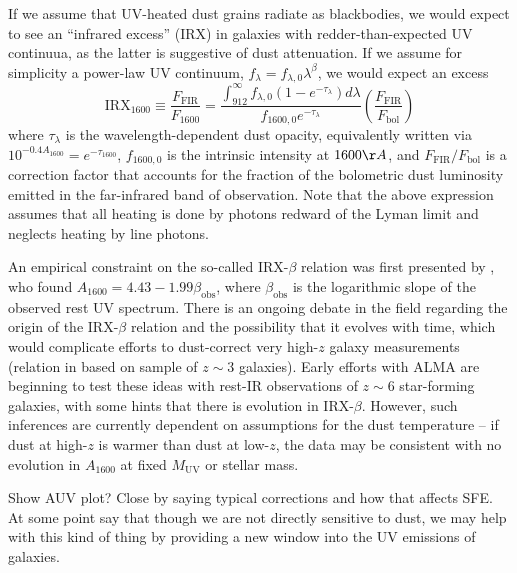 If we assume that UV-heated dust grains radiate as blackbodies, we would expect to see an ``infrared excess'' (IRX) in galaxies with redder-than-expected UV continuua, as the latter is suggestive of dust attenuation. If we assume for simplicity a power-law UV continuum, $f_{\lambda} = f_{\lambda,0} \lambda^{\beta}$, we would expect an excess
\begin{equation}
	\mathrm{IRX}_{1600} \equiv \frac{F_{\mathrm{FIR}}}{F_{1600}} = \frac{\int_{912}^{\infty} f_{\lambda,0} (1 - e^{-\tau_{\lambda}}) d\lambda}{f_{1600,0} e^{-\tau_{\lambda}}} \left(\frac{F_{\mathrm{FIR}}}{F_{\mathrm{bol}}} \right)
\end{equation}
where $\tau_{\lambda}$ is the wavelength-dependent dust opacity, equivalently written via $10^{-0.4 A_{1600}} = e^{-\tau_{1600}}$, $f_{1600,0}$ is the intrinsic intensity at $1600 \AA$, and $F_{\mathrm{FIR}}/F_{\mathrm{bol}}$ is a correction factor that accounts for the fraction of the bolometric dust luminosity emitted in the far-infrared band of observation. Note that the above expression assumes that all heating is done by photons redward of the Lyman limit and neglects heating by line photons.

An empirical constraint on the so-called IRX-$\beta$ relation was first presented by \cite{Meurer1999}, who found $A_{1600} = 4.43 - 1.99 \beta_{\mathrm{obs}}$, where $\beta_{\mathrm{obs}}$ is the logarithmic slope of the observed rest UV spectrum. There is an ongoing debate in the field regarding the origin of the IRX-$\beta$ relation and the possibility that it evolves with time, which would complicate efforts to dust-correct very high-$z$ galaxy measurements (relation in \cite{Meurer1999} based on sample of $z \sim 3$ galaxies). Early efforts with ALMA are beginning to test these ideas with rest-IR observations of $z \sim 6$ star-forming galaxies, with some hints that there is evolution in IRX-$\beta$. However, such inferences are currently dependent on assumptions for the dust temperature -- if dust at high-$z$ is warmer than dust at low-$z$, the data may be consistent with no evolution in $A_{1600}$ at fixed $M_{\mathrm{UV}}$ or stellar mass.

{\color{red} Show AUV plot?}
{\color{red} Close by saying typical corrections and how that affects SFE.}
{\color{red} At some point say that though we are not directly sensitive to dust, we may help with this kind of thing by providing a new window into the UV emissions of galaxies.}

